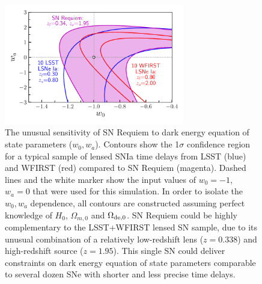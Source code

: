 \documentclass[fleqn,10pt]{wlscirep}
\begin{document}
\begin{figure}
    \centering
    \includegraphics[width=0.7\textwidth]{../Figures/snrequiem_w0wa_compared_to_lsst_wfirst.pdf}
    \caption{The unusual sensitivity of SN Requiem to dark energy equation of state parameters ($w_0, w_a$). Contours show the 1$\sigma$ confidence region for a typical sample of lensed SNIa time delays from LSST (blue) and WFIRST (red) compared to SN Requiem (magenta). Dashed lines and the white marker show the input values of $w_0=-1$, $w_a=0$ that were used for this simulation. In order to isolate the $w_0, w_a$ dependence, all contours are constructed assuming perfect knowledge of $H_0$, $\Omega_{m,0}$ and $\Omega_{\rm de,0}$.  SN Requiem could be highly complementary to the LSST+WFIRST lensed SN sample, due to its unusual combination of a relatively low-redshift lens ($z=0.338$) and high-redshift source ($z=1.95$). This single SN could deliver constraints on dark energy equation of state parameters comparable to several dozen SNe with shorter and less precise  time delays.}
    \label{fig:my_label}
\end{figure}



\end{document}
